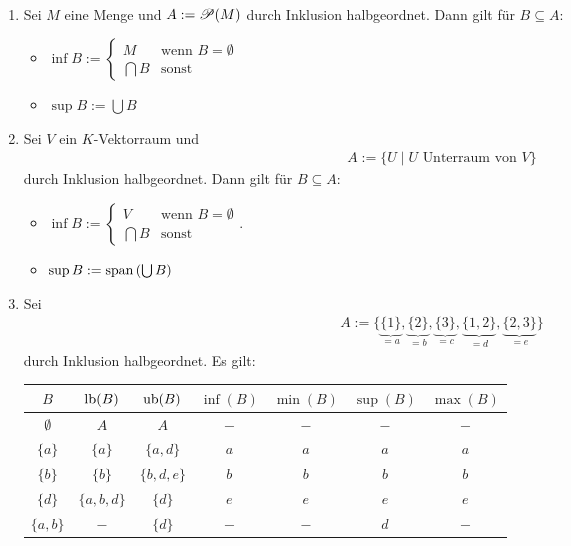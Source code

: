 \documentclass[../../main.tex]{subfiles}
\begin{document}
\begin{bsp}\label{12.1.8}
	$\;$
	\begin{enumerate}[\normalfont(a)]
		\item Sei $M$ eine Menge und $A:=\mathcal P(M)$ durch Inklusion halbgeordnet. Dann gilt für $B\subseteq A$:
		\begin{itemize}
			\item $\inf B:=\begin{cases} M & \text{wenn } B=\emptyset\\ \bigcap B & \text{sonst}\end{cases}$
			\item $\sup B:=\bigcup B$
		\end{itemize}
		\item Sei $V$ ein $K$-Vektorraum und
		\begin{align*}
			A:=\{U\mid U \text{ Unterraum von } V\}
		\end{align*}
		durch Inklusion halbgeordnet. Dann gilt für $B\subseteq A$:
		\begin{itemize}
			\item $\inf B:=\begin{cases} V & \text{wenn }B=\emptyset\\ \bigcap B & \text{sonst}\end{cases}$.
			\item $\sup B:=\operatorname{span}\left(\bigcup B\right)$
		\end{itemize}
		\item Sei
		\begin{align*}
			A:=\{\underbrace{\{1\}}_{=a},\underbrace{\{2\}}_{=b},\underbrace{\{3\}}_{=c},\underbrace{\{1,2\}}_{=d},\underbrace{\{2,3\}}_{=e}\}
		\end{align*}
		durch Inklusion halbgeordnet. Es gilt:
		\begin{table}[H]
			\centering
			\begin{tabular}{c|c|c|c|c|c|c}
				$B$ & $\operatorname{lb}(B)$ & $\operatorname{ub}(B)$ & $\inf(B)$ & $\min(B)$ & $\sup(B)$ & $\max(B)$\\
				\hline
				$\emptyset$ & $A$ & $A$ & $-$ & $-$ & $-$ & $-$\\
				$\{a\}$ & $\{a\}$ & $\{a,d\}$ & $a$ & $a$ & $a$ & $a$\\
				$\{b\}$ & $\{b\}$ & $\{b,d,e\}$ & $b$ & $b$ & $b$ & $b$\\
				$\{d\}$ & $\{a,b,d\}$ & $\{d\}$ & $e$ & $e$ & $e$ & $e$\\
				$\{a,b\}$ & $-$ & $\{d\}$ & $-$ & $-$ & $d$ & $-$\\

\end{tabular}
\end{table}
\end{enumerate}
\end{bsp}
\end{document}
